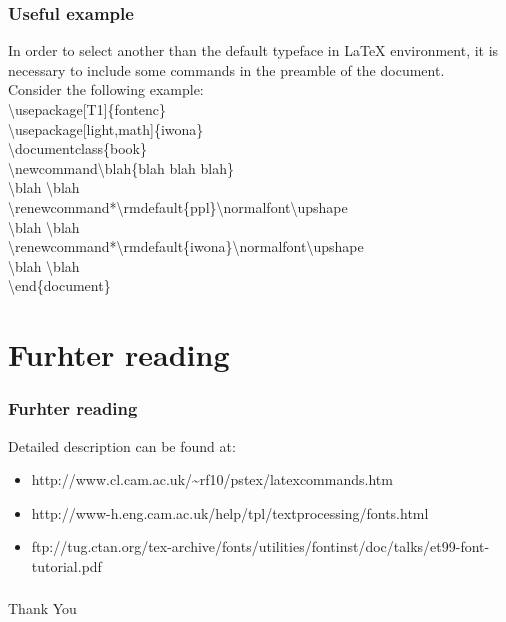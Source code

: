 \documentclass{beamer}
\begin{document}

\begin{frame}[fragile]
\frametitle{Useful example}
\vspace{-0.7cm}
\footnotesize{In order to select another than the default typeface in LaTeX environment, it is necessary to include some commands in the preamble of the document.}\\[5 pt]
\footnotesize{Consider the following example:}\\[5 pt]
\tiny{\textbackslash usepackage[T1]\{fontenc\}}\\[5 pt]
\tiny{\textbackslash usepackage[light,math]\{iwona\}}\\[15 pt]
\tiny{\textbackslash documentclass\{book\}}\\[5 pt]
\tiny{\textbackslash newcommand\textbackslash blah\{blah blah blah\}}\\[5 pt]
\tiny{\textbackslash blah \textbackslash blah }\\[5 pt]
\tiny{\textbackslash renewcommand*\textbackslash rmdefault\{ppl\}\textbackslash normalfont\textbackslash upshape}\\[5 pt]
\tiny{\textbackslash blah \textbackslash blah }\\[5 pt]
\tiny{\textbackslash renewcommand*\textbackslash rmdefault\{iwona\}\textbackslash normalfont\textbackslash upshape}\\[5 pt]
\tiny{\textbackslash blah \textbackslash blah }\\
\tiny{\textbackslash end\{document\}} 
\end{frame}


\section{Furhter reading}

\begin{frame}[fragile]
\frametitle{Furhter reading}
\vspace{-0.3cm}
\normalsize{Detailed description can be found at:}\\

\begin{itemize}
\item \footnotesize{http://www.cl.cam.ac.uk/\~{}rf10/pstex/latexcommands.htm}
\item \footnotesize{http://www-h.eng.cam.ac.uk/help/tpl/textprocessing/fonts.html}
\item \footnotesize{ftp://tug.ctan.org/tex-archive/fonts/utilities/fontinst/doc/talks/et99-font-tutorial.pdf}
\end{itemize}
\end{frame}


\begin{frame}[fragile]
\frametitle{}
\centering \Huge{Thank You}
\end{frame}
\end{document}
